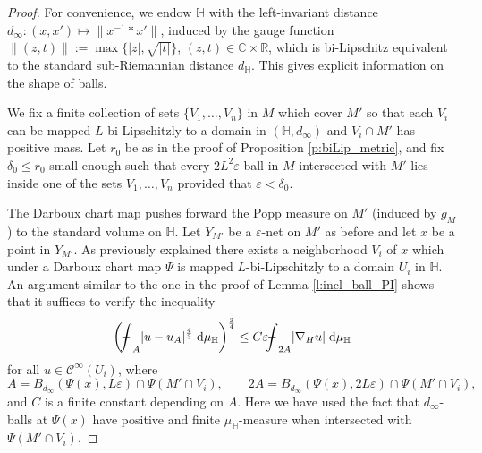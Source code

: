 \documentclass[10pt,letterpaper]{amsart}
\theoremstyle{definition}
\numberwithin{thm}{subsection}
\numberwithin{equation}{section}
\begin{document}
\begin{proof}
For convenience, we endow ${\mathbb H}$ with the left-invariant distance  $d_{\infty}:(x,x')\mapsto \|x^{-1}\ast x'\|$, induced by the gauge function $\|(z,t)\|:=\max\{|z|,\sqrt{|t|}\}$, $(z,t)\in \mathbb{C}\times \mathbb{R}$, which is bi-Lipschitz equivalent to the standard sub-Riemannian distance $d_{\mathbb H}$. This gives explicit information on the shape of balls.

We fix a finite collection of sets $\{V_1,\ldots, V_n\}$ in $M$ which cover $M'$ so that each $V_i$ can be mapped $L$-bi-Lipschitzly to a domain in $({\mathbb H},d_\infty)$ and $V_i \cap M'$ has positive mass. Let $r_0$ be as in the proof of Proposition \ref{p:biLip_metric}, and fix $\delta_0 \le r_0$ small enough such that 
every $2L^2\varepsilon$-ball in $M$ intersected with $M'$ lies inside one of the sets $V_1,\ldots,V_n$ provided that $\varepsilon < \delta_0$.

The Darboux chart map pushes forward the Popp measure on $M'$ (induced by $g_M$) to the standard volume on ${\mathbb H}$. Let $Y_{M'}$ be a $\varepsilon$-net on $M'$ as before and let $x$ be a point in $Y_{M'}$. As previously explained there exists a neighborhood $V_i$ of $x$ which under a Darboux chart map $\Psi$ is mapped $L$-bi-Lipschitzly to a domain $U_i$ in ${\mathbb H}$. An argument similar to the one in the proof of Lemma \ref{l:incl_ball_PI} shows that it suffices to verify the inequality
\begin{align}\label{eq:PI_for_ball}
\left({\mathchoice
          {\mathop{\vrule width 6pt height 3 pt depth -2.5pt
                  \kern -8pt \intop}\nolimits_{{A}}}          {\mathop{\vrule width 5pt height 3 pt depth -2.6pt
                  \kern -6pt \intop}\nolimits_{{A}}}          {\mathop{\vrule width 5pt height 3 pt depth -2.6pt
                  \kern -6pt \intop}\nolimits_{{A}}}          {\mathop{\vrule width 5pt height 3 pt depth -2.6pt
                  \kern -6pt \intop}\nolimits_{{A}}}}|u-u_{A}|^{\frac{4}{3}}\;\mathrm{d}\mu_{\mathbb H}\right)^{\frac{3}{4}}\leq C \varepsilon {\mathchoice
          {\mathop{\vrule width 6pt height 3 pt depth -2.5pt
                  \kern -8pt \intop}\nolimits_{{2A}}}          {\mathop{\vrule width 5pt height 3 pt depth -2.6pt
                  \kern -6pt \intop}\nolimits_{{2A}}}          {\mathop{\vrule width 5pt height 3 pt depth -2.6pt
                  \kern -6pt \intop}\nolimits_{{2A}}}          {\mathop{\vrule width 5pt height 3 pt depth -2.6pt
                  \kern -6pt \intop}\nolimits_{{2A}}}}|\nabla_H u|\;\mathrm{d}\mu_{\mathbb H}
\end{align}
for all  $u\in \mathcal{C}^{\infty}(U_i)$, where
\begin{displaymath}
A=B_{d_{\infty}}(\Psi(x),L\varepsilon)\cap \Psi(M'\cap V_i), \qquad 2A= B_{d_{\infty}}(\Psi(x),2L\varepsilon)\cap \Psi(M'\cap V_i),
\end{displaymath}
and $C$ is a finite constant depending on $A$. Here we have used the fact that $d_{\infty}$-balls at $\Psi(x)$ have positive and finite $\mu_{\mathbb H}$-measure when intersected with $\Psi( M'\cap V_i)$.


\end{proof}
\end{document}
